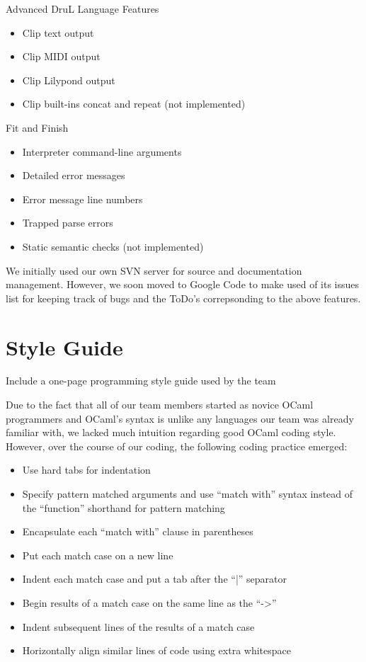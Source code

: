 \begin{enumeration}
\item Advanced DruL Language Features
\begin{itemize}
	\item Clip text output
	\item Clip MIDI output
	\item Clip Lilypond output
	\item Clip built-ins concat and repeat (not implemented)
\end{itemize}

\item Fit and Finish
\begin{itemize}
	\item Interpreter command-line arguments
	\item Detailed error messages
	\item Error message line numbers
	\item Trapped parse errors
	\item Static semantic checks (not implemented)
\end{itemize}

\end{enumeration}

We initially used our own SVN server for source and documentation management.  However, we soon moved to Google Code to make used of its issues list for keeping track of bugs and the ToDo's correpsonding to the above features.

\section{Style Guide}
Include a one-page programming style guide used by the team

Due to the fact that all of our team members started as novice OCaml programmers and OCaml's syntax is unlike any languages our team was already familiar with, we lacked much intuition regarding good OCaml coding style.  However, over the course of our coding, the following coding practice emerged:

\begin{itemize}
	\item Use hard tabs for indentation
	\item Specify pattern matched arguments and use ``match with'' syntax instead of the ``function'' shorthand for pattern matching
	\item Encapsulate each ``match with'' clause in parentheses
	\item Put each match case on a new line
	\item Indent each match case and put a tab after the ``|'' separator
	\item Begin results of a match case on the same line as the ``->''
	\item Indent subsequent lines of the results of a match case
	\item Horizontally align similar lines of code using extra whitespace
\end{itemize}

